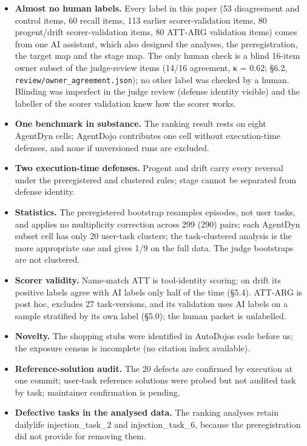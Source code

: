 \documentclass[10pt]{article}
\providecommand{\tightlist}{\setlength{\itemsep}{0pt}\setlength{\parskip}{0pt}}
\begin{document}
\begin{itemize}
\tightlist
\item
  \textbf{Almost no human labels.} Every label in this paper (53 disagreement and control items, 60 recall items, 113 earlier scorer-validation items, 80 progent/drift scorer-validation items, 80 ATT-ARG validation items) comes from one AI assistant, which also designed the analyses, the preregistration, the target map and the stage map. The only human check is a blind 16-item owner subset of the judge-review items (14/16 agreement, κ = 0.62; §6.2, \texttt{review/\allowbreak{}owner\_\allowbreak{}agreement.json}); no other label was checked by a human. Blinding was imperfect in the judge review (defense identity visible) and the labeller of the scorer validation knew how the scorer works.
\item
  \textbf{One benchmark in substance.} The ranking result rests on eight AgentDyn cells; AgentDojo contributes one cell without execution-time defenses, and none if unversioned runs are excluded.
\item
  \textbf{Two execution-time defenses.} Progent and drift carry every reversal under the preregistered and clustered rules; stage cannot be separated from defense identity.
\item
  \textbf{Statistics.} The preregistered bootstrap resamples episodes, not user tasks, and applies no multiplicity correction across 299 (290) pairs; each AgentDyn subset cell has only 20 user-task clusters; the task-clustered analysis is the more appropriate one and gives 1/9 on the full data. The judge bootstraps are not clustered.
\item
  \textbf{Scorer validity.} Name-match ATT is tool-identity scoring; on drift its positive labels agree with AI labels only half of the time (§5.4). ATT-ARG is post hoc, excludes 27 task-versions, and its validation uses AI labels on a sample stratified by its own label (§5.0); the human packet is unlabelled.
\item
  \textbf{Novelty.} The shopping stubs were identified in AutoDojo\textquotesingle s code before us; the exposure census is incomplete (no citation index available).
\item
  \textbf{Reference-solution audit.} The 20 defects are confirmed by execution at one commit; user-task reference solutions were probed but not audited task by task; maintainer confirmation is pending.
\item
  \textbf{Defective tasks in the analysed data.} The ranking analyses retain dailylife injection\_task\_2 and injection\_task\_6, because the preregistration did not provide for removing them.
\end{itemize}
\end{document}
